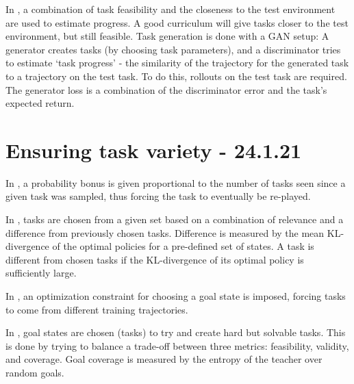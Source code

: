 \documentclass[letterpaper]{article}
\theoremstyle{definition}
\begin{document}
In \cite{Fang2020}, a combination of task feasibility and the closeness to the test environment are used to estimate progress. A good curriculum will give tasks closer to the test environment, but still feasible. Task generation is done with a GAN setup: A generator creates tasks (by choosing task parameters), and a discriminator tries to estimate `task progress' - the similarity of the trajectory for the generated task to a trajectory on the test task. To do this, rollouts on the test task are required. The generator loss is a combination of the discriminator error and the task's expected return.

\section{Ensuring task variety - 24.1.21} \label{sec:variety}

In \cite{Jiang2020}, a probability bonus is given proportional to the number of tasks seen since a given task was sampled, thus forcing the task to eventually be re-played.

In \cite{Gutierrez2020}, tasks are chosen from a given set based on a combination of relevance and a difference from previously chosen tasks. Difference is measured by the mean KL-divergence of the optimal policies for a pre-defined set of states. A task is different from chosen tasks if the KL-divergence of its optimal policy is sufficiently large.

In \cite{Reny2019}, an optimization constraint for choosing a goal state is imposed, forcing tasks to come from different training trajectories.

In \cite{Racaniere2019}, goal states are chosen (tasks) to try and create hard but solvable tasks. 
This is done by trying to balance a trade-off between three metrics: feasibility, validity, and coverage.
Goal coverage is measured by the entropy of the teacher over random goals.
\end{document}
